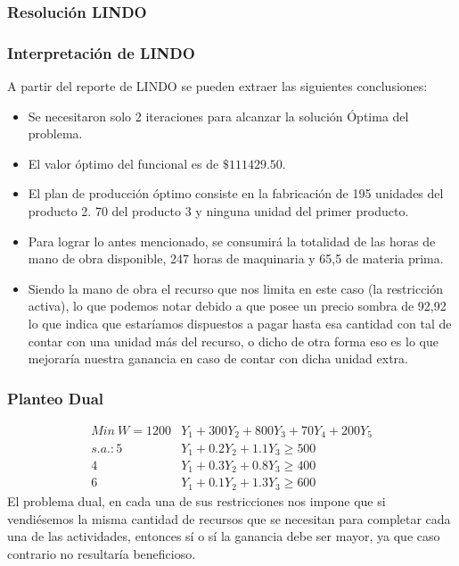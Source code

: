 \begin{homeworkProblem}[-1][Empresita]
\subsubsection{Resolución LINDO}
\subsubsection{Interpretación de LINDO}
A partir del reporte de LINDO se pueden extraer las siguientes conclusiones: 
\begin{itemize}
    \item Se necesitaron solo 2 iteraciones para alcanzar la solución Óptima del problema.
    \item El valor óptimo del funcional es de $\$111429.50$.
    \item El plan de producción óptimo consiste en la fabricación de 195 unidades del producto 2. 70 del producto 3 y ninguna unidad del primer producto.
    \item Para lograr lo antes mencionado, se consumirá la totalidad de las horas de mano de obra disponible, 247 horas de maquinaria y 65,5 de materia prima.
    \item Siendo la mano de obra el recurso que nos limita en este caso (la restricción activa), lo que podemos notar debido a que posee un precio sombra de 92,92 lo que indica que estaríamos dispuestos a pagar hasta esa cantidad con tal de contar con una unidad más del recurso, o dicho de otra forma eso es lo que mejoraría nuestra ganancia en caso de contar con dicha unidad extra.
\end{itemize}

\subsubsection{Planteo Dual}
\begin{align*}
    Min\ W = 1200&Y_1 + 300Y_2 + 800Y_3 + 70Y_4 + 200Y_5 \\
    s.a.:5&Y_1 + 0.2Y_2 + 1.1Y_3 \ge 500 \\
    4&Y_1 + 0.3Y_2 + 0.8Y_3 \ge 400 \\
    6&Y_1 + 0.1Y_2 + 1.3Y_3 \ge 600
\end{align*}
El problema dual, en cada una de sus restricciones nos impone que si vendiésemos la misma cantidad de recursos que se necesitan para completar cada una de las actividades, entonces sí o sí la ganancia debe ser mayor, ya que caso contrario no resultaría beneficioso.
\end{homeworkProblem} 